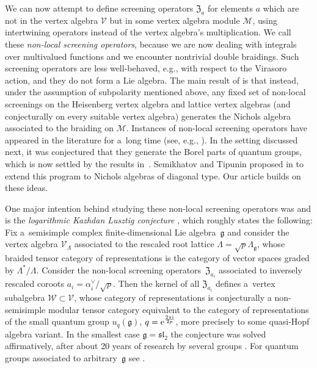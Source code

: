 \documentclass[10pt,a4paper]{amsart}
\numberwithin{equation}{section}
\newcommand{\g}{\mathfrak{g}}
\newcommand{\zem}{\mathfrak{Z}}
\begin{document}
We can now attempt to define screening operators $\zem_a$ for elements $a$ which are not in the vertex algebra $\mathcal{V}$ but in some vertex algebra module $\mathcal{M}$, using intertwining operators instead of the vertex algebra's multiplication. We call these \emph{non-local screening operators}, because we are now dealing with integrals over multivalued functions and we encounter nontrivial double braidings. Such screening operators are less well-behaved, e.g., with respect to the Virasoro action, and they do not form a Lie algebra. The main result of \cite{Len17} is that instead, under the assumption of subpolarity mentioned above, any fixed set of non-local screenings on the Heisenberg vertex algebra and lattice vertex algebras (and conjecturally on every suitable vertex algebra) generates the Nichols algebra associated to the braiding on $\mathcal{M}$. Instances of non-local screening operators have appeared in the literature for a~long time (see, e.g., \cite{FF84,Fel89}). In the setting discussed next, it was conjectured that they generate the Borel parts of quantum groups, which is now settled by the results in~\cite{Len17}. Semikhatov and Tipunin proposed in \cite{Sem14, ST13} to extend this program to Nichols algebras of diagonal type. Our article builds on these ideas.

One major intention behind studying these non-local screening operators was and is the \emph{logarithmic Kazhdan Lusztig conjecture} \cite{AM08,FT10,FGST06a}, which roughly states the following: Fix a~semisimple complex finite-dimensional Lie algebra~$\g$ and consider the vertex algebra $\mathcal{V}_\Lambda$ associated to the rescaled root lattice $\Lambda=\sqrt{p}\Lambda_\g$, whose braided tensor category of representations is the category of vector spaces graded by $\Lambda^*/\Lambda$. Consider the non-local screening operators~$\zem_{a_i}$ associated to inversely rescaled coroots $a_i=\alpha_i^\vee/\sqrt{p}$. Then the kernel of all $\zem_{a_i}$ defines a~vertex subalgebra $\mathcal{W}\subset\mathcal{V}$, whose category of representations is conjecturally a non-semisimple modular tensor category equivalent to the category of representations of the small quantum group $u_q(\g)$, $q={\rm e}^{\frac{2\pi {\rm i}}{2p}}$, more precisely to some quasi-Hopf algebra variant. In the smallest case $\g=\mathfrak{sl}_2$ the conjecture was solved affirmatively, after about 20 years of research by several groups \cite{AM08,CLR21, CGR20,FGST06a, GN21, NT11, TW13}. For quantum groups associated to arbitrary~$\g$ see \cite{AM14,FT10,GLO18,Len17}.
\end{document}
